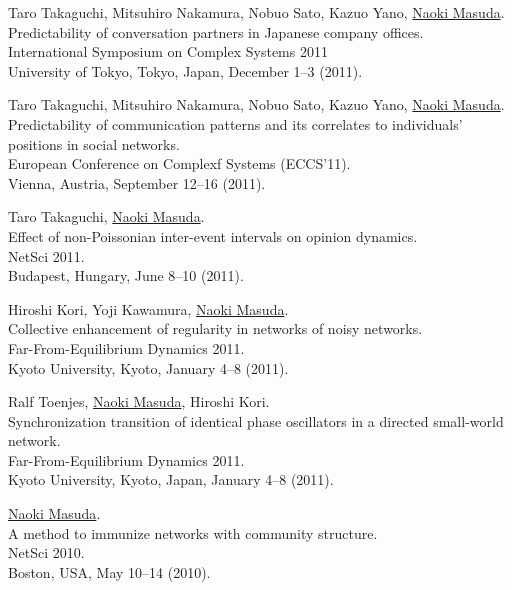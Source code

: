 \documentclass[11pt,letter]{article}
\begin{document}
\begin{etaremune}
\item Taro Takaguchi, Mitsuhiro Nakamura, Nobuo Sato, Kazuo Yano, \underline{Naoki Masuda}.\\
Predictability of conversation partners in Japanese company offices.\\
International Symposium on Complex Systems 2011\\
University of Tokyo, Tokyo, Japan, December 1--3 (2011).

\item Taro Takaguchi, Mitsuhiro Nakamura, Nobuo Sato, Kazuo Yano, \underline{Naoki Masuda}.\\
Predictability of communication patterns and its correlates to individuals' positions in social networks.\\
European Conference on Complexf Systems (ECCS'11).\\
Vienna, Austria, September 12--16 (2011).

\item Taro Takaguchi, \underline{Naoki Masuda}.\\
Effect of non-Poissonian inter-event intervals on opinion dynamics.\\
NetSci 2011.\\
Budapest, Hungary, June 8--10 (2011).

\item Hiroshi Kori, Yoji Kawamura, \underline{Naoki Masuda}.\\
Collective enhancement of regularity in networks of noisy networks.\\
Far-From-Equilibrium Dynamics 2011.\\
Kyoto University, Kyoto, January 4--8 (2011).

\item Ralf Toenjes, \underline{Naoki Masuda}, Hiroshi Kori.\\
Synchronization transition of identical phase oscillators in a directed small-world network.\\
Far-From-Equilibrium Dynamics 2011.\\
Kyoto University, Kyoto, Japan, January 4--8 (2011).

\item \underline{Naoki Masuda}.\\
A method to immunize networks with community structure.\\
NetSci 2010.\\
Boston, USA, May 10--14 (2010).


\end{etaremune}
\end{document}
